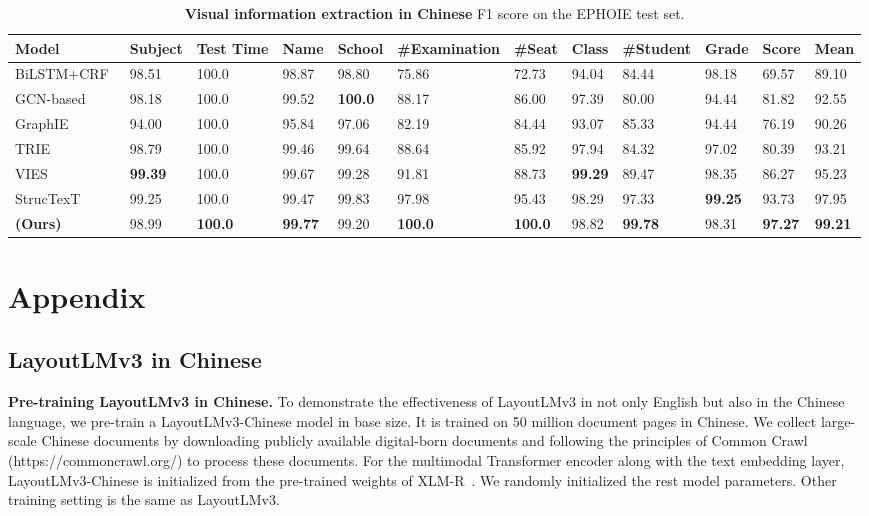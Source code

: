 \documentclass[sigconf]{acmart}
\begin{document}
\begin{table*}[ht]
    \centering
    \caption{\textbf{Visual information extraction in Chinese} F1 score on the EPHOIE test set.}
    \label{tab:EPHOIE}
    \resizebox{\textwidth}{!}
    {
    \begin{tabular}{llllllllllll}
        \toprule
        \multicolumn{1}{l}{\bf Model} & \bf Subject & \bf Test Time & \bf Name & \bf School & \bf \#Examination & \bf \#Seat & \bf Class & \bf \#Student & \bf Grade & \bf Score & \bf Mean \\
        \midrule
        BiLSTM+CRF~\cite{lample2016neural} & 98.51 & 100.0 & 98.87 & 98.80 & 75.86 & 72.73 & 94.04 & 84.44 & 98.18 & 69.57 & 89.10 \\
        GCN-based~\cite{liu2019graph} & 98.18 & 100.0 & 99.52 & \bf 100.0 & 88.17 & 86.00 & 97.39 & 80.00 & 94.44 & 81.82 & 92.55 \\
        GraphIE~\cite{qian2019graph} & 94.00 & 100.0 & 95.84 & 97.06 & 82.19 & 84.44 & 93.07 & 85.33 & 94.44 & 76.19 & 90.26 \\
        TRIE~\cite{zhang2020trie} & 98.79 & 100.0 & 99.46 & 99.64 & 88.64 & 85.92 & 97.94 & 84.32 & 97.02 & 80.39 & 93.21 \\
        VIES~\cite{wang2021towards} & \bf 99.39 & 100.0 &  99.67 & 99.28 & 91.81 & 88.73 & \bf 99.29 & 89.47 & 98.35 & 86.27 & 95.23 \\
        StrucTexT~\cite{li2021structext} & 99.25 & 100.0 & 99.47 & 99.83 & 97.98 & 95.43 & 98.29 & 97.33 & \bf 99.25 & 93.73 & 97.95 \\
        \midrule
        \bf  (Ours) & 98.99 & \bf 100.0 & \bf 99.77 & 99.20 & \bf 100.0 & \bf 100.0 & 98.82 & \bf 99.78 & 98.31 & \bf 97.27 & \bf 99.21 \\
        \bottomrule
    \end{tabular}
    }
\end{table*}


\newpage\appendix
\section{Appendix}

\subsection{LayoutLMv3 in Chinese}

\noindent \textbf{Pre-training LayoutLMv3 in Chinese.}
To demonstrate the effectiveness of LayoutLMv3 in not only English but also in the Chinese language, we pre-train a LayoutLMv3-Chinese model in base size. It is trained on 50 million document pages in Chinese.
We collect large-scale Chinese documents by downloading publicly available digital-born documents and following the principles of Common Crawl (https://commoncrawl.org/) to process these documents.
For the multimodal Transformer encoder along with the text embedding layer, LayoutLMv3-Chinese is initialized from the pre-trained weights of XLM-R~\cite{conneau2020unsupervised}.
We randomly initialized the rest model parameters.
Other training setting is the same as LayoutLMv3.
\end{document}
